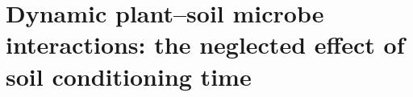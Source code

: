 \chapter{Dynamic plant--soil microbe interactions: the neglected effect of soil conditioning time}
\fancyhead[LE, RO]{\thepage}
\fancyfoot{}
\renewcommand{\headrulewidth}{0pt}
\setlength{\parindent}{1cm}


